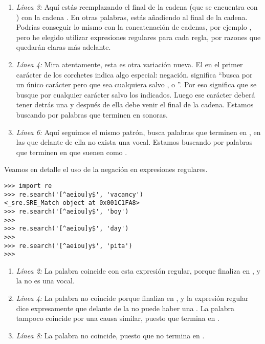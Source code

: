 \begin{enumerate}

\item \emph{Línea 3:} Aquí estás reemplazando el final de la cadena (que se encuentra con \codigo{\$}) con la cadena . En otras palabras, estás añadiendo  al final de la cadena. Podrías conseguir lo mismo con la concatenación de cadenas, por ejemplo , pero he elegido utilizar expresiones regulares para cada regla, por razones que quedarán claras más adelante.

\item \emph{Línea 4:} Mira atentamente, esta es otra variación nueva. El \codigo{\^} en el primer carácter de los corchetes indica  algo especial: negación. \codigo{[\^abc]} significa ``busca por un único carácter pero que sea cualquiera salvo ,  o ''. Por eso \codigo{[\^aeioudgkprt]} significa que se busque por cualquier carácter salvo los indicados. Luego ese carácter deberá tener detrás una  y después de ella debe venir el final de la cadena. Estamos buscando por palabras que terminen en  sonoras.

\item \emph{Línea 6:} Aquí seguimos el mismo patrón, busca palabras que terminen en , en las que delante de ella no exista una vocal. Estamos buscando por palabras que terminen en  que suenen como . 

\end{enumerate}

Veamos en detalle el uso de la negación en expresiones regulares.

\noindent\begin{minipage}{\textwidth}
\begin{lstlisting}[mathescape=False]
>>> import re
>>> re.search('[^aeiou]y$', 'vacancy')
<_sre.SRE_Match object at 0x001C1FA8>
>>> re.search('[^aeiou]y$', 'boy')
>>> 
>>> re.search('[^aeiou]y$', 'day')
>>> 
>>> re.search('[^aeiou]y$', 'pita')
>>> 
\end{lstlisting}
\end{minipage}

\begin{enumerate}

\item \emph{Línea 2:} La palabra  coincide con esta expresión regular, porque finaliza en , y la  no es una vocal.

\item \emph{Línea 4:} La palabra  no coincide porque finaliza en , y la expresión regular dice expresamente que delante de la  no puede haber una . La palabra  tampoco coincide por una causa similar, puesto que termina en .

\item \emph{Línea 8:} La palabra  no coincide, puesto que no termina en .

\end{enumerate}

